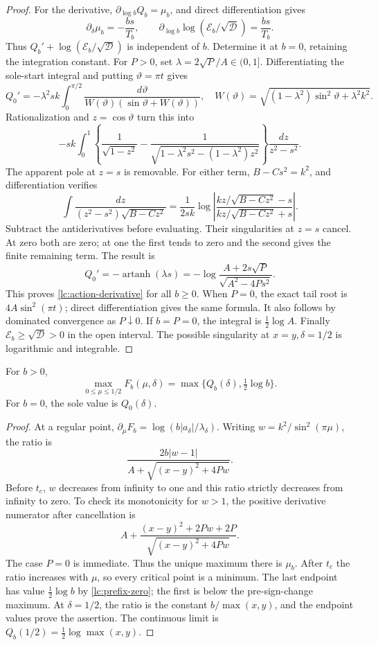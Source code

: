 \begin{proof}
For the derivative, \(\partial_{\log b}Q_b=\mu_b\), and
direct differentiation gives
\[
 \partial_\delta\mu_b=-\frac{bs}{T_b},\qquad
 \partial_{\log b}\log(\mathcal E_b/\sqrt{\mathcal D})
                                      =\frac{bs}{T_b}.
\]
Thus \(Q_b'+\log(\mathcal E_b/\sqrt{\mathcal D})\) is independent
of \(b\). Determine it at \(b=0\), retaining the integration constant.
For \(P>0\), set \(\lambda=2\sqrt P/A\in(0,1]\).
Differentiating the sole-start integral and putting
\(\vartheta=\pi t\) gives
\[
 Q_0'=-\lambda^2sk\int_0^{\pi/2}
 \frac{d\vartheta}{W(\vartheta)(\sin\vartheta+W(\vartheta))},
 \quad W(\vartheta)=
       \sqrt{(1-\lambda^2)\sin^2\vartheta+\lambda^2k^2}.
\]
Rationalization and \(z=\cos\vartheta\) turn this into
\[
 -sk\int_0^1\left\{\frac1{\sqrt{1-z^2}}-
 \frac1{\sqrt{1-\lambda^2s^2-(1-\lambda^2)z^2}}\right\}
                                  \frac{dz}{z^2-s^2}.
\]
The apparent pole at \(z=s\) is removable. For either term,
\(B-Cs^2=k^2\), and differentiation verifies
\[
 \int\frac{dz}{(z^2-s^2)\sqrt{B-Cz^2}}
 =\frac1{2sk}\log\left|
     \frac{kz/\sqrt{B-Cz^2}-s}{kz/\sqrt{B-Cz^2}+s}\right|.
\]
Subtract the antiderivatives before evaluating. Their singularities
at \(z=s\) cancel. At zero both are zero; at one the first tends to
zero and the second gives the finite remaining term. The result is
\[
 Q_0'=-\operatorname{artanh}(\lambda s)
 =-\log\frac{A+2s\sqrt P}{\sqrt{A^2-4Ps^2}} .
\]
This proves \eqref{lc:action-derivative} for all \(b\ge0\).
When \(P=0\), the exact tail root is \(4A\sin^2(\pi t)\);
direct differentiation gives the same formula. It also follows by
dominated convergence as \(P\downarrow0\).
If \(b=P=0\), the integral is \(\frac12\log A\).
Finally \(\mathcal E_b\ge\sqrt{\mathcal D}>0\) in the open interval.
The possible singularity at \(x=y,\delta=1/2\) is logarithmic and
integrable.
\end{proof}

\begin{lemma}\label{lc:cofactor-max}
For \(b>0\),
\[
 \max_{0\le\mu\le1/2}F_b(\mu,\delta)
                =\max\{Q_b(\delta),\tfrac12\log b\}.
\]
For \(b=0\), the sole value is \(Q_0(\delta)\).
\end{lemma}
\begin{proof}
At a regular point, \(\partial_\mu F_b=\log(b|a_\delta|/\lambda_\delta)\).
Writing \(w=k^2/\sin^2(\pi\mu)\), the ratio is
\[
                  \frac{2b|w-1|}{A+\sqrt{(x-y)^2+4Pw}} .
\]
Before \(t_c\), \(w\) decreases from infinity to one and this ratio
strictly decreases from infinity to zero. To check its monotonicity
for \(w>1\), the positive derivative numerator after cancellation is
\[
             A+\frac{(x-y)^2+2Pw+2P}{\sqrt{(x-y)^2+4Pw}} .
\]
The case \(P=0\) is immediate. Thus the unique maximum there is
\(\mu_b\). After \(t_c\) the ratio increases with \(\mu\), so
every critical point is a minimum. The last endpoint has value
\(\frac12\log b\) by \eqref{lc:prefix-zero}; the first is below
the pre-sign-change maximum.
At \(\delta=1/2\), the ratio is the constant \(b/\max(x,y)\),
and the endpoint values prove the assertion. The continuous limit is
\(Q_b(1/2)=\frac12\log\max(x,y)\).
\end{proof}

